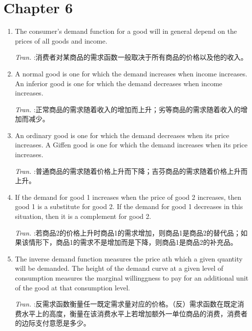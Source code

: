 \documentclass[11pt]{article}
\begin{document}
\section{Chapter 6}
\label{sec:org4f920fc}
\begin{enumerate}
\item The consumer's demand function for a good will in general depend on the prices of all goods and income.

\emph{Tran.} :消费者对某商品的需求函数一般取决于所有商品的价格以及他的收入。

\item A normal good is one for which the demand increases when income increases. An inferior good is one for which the demand decreases when income increases.

\emph{Tran.} :正常商品的需求随着收入的增加而上升；劣等商品的需求随着收入的增加而减少。

\item An ordinary good is one for which the demand decreases when its price increases. A Giffen good is one for which the demand increases when its price increases.

\emph{Tran.} :普通商品的需求随着价格上升而下降；吉芬商品的需求随着价格上升而上升。

\item If the demand for good 1 increases when the price of good 2 increases, then good 1 is a substitute for good 2. If the demand for good 1 decreases in this situation, then it is a complement for good 2.

\emph{Tran.} :若商品2的价格上升时商品1的需求增加，则商品1是商品2的替代品；如果该情形下，商品1的需求不是增加而是下降，则商品1是商品2的补充品。

\item The inverse demand function measures the price ath which a given quantity will be demanded. The height of the demand curve at a given level of consumption measures the marginal willinggness to pay for an additional unit of the good at that consumption level.

\emph{Tran.} :反需求函数衡量任一既定需求量对应的价格。（反）需求函数在既定消费水平上的高度，衡量在该消费水平上若增加额外一单位商品的消费，消费者的边际支付意愿是多少。
\end{enumerate}
\end{document}
